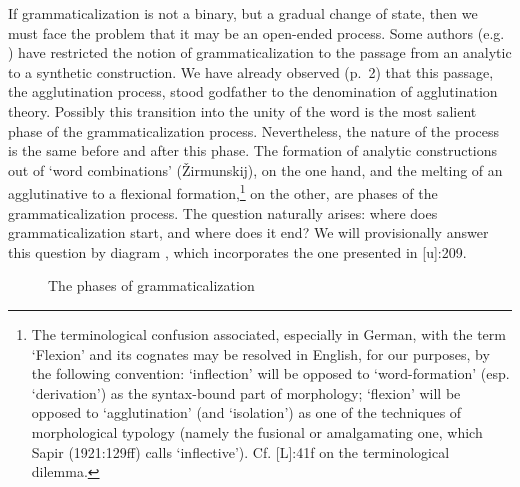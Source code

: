 If grammaticalization is not a binary, but a gradual change of state, then we must face the problem that it may be an open-ended process. Some authors (e.g. \citet[113-115]{Ronneberger-Sibold1980}) have restricted the notion of grammaticalization to the passage from an analytic to a synthetic construction. We have already observed (p.~2) that this passage, the agglutination process, stood godfather to the denomination of agglutination theory. Possibly this transition into the unity of the word is the most salient phase of the grammaticalization process. Nevertheless, the nature of the process is the same before and after this phase. The formation of analytic constructions out of ‘word combinations’ (Žirmunskij), on the one hand, and the melting  of an agglutinative to a flexional formation,\footnote{The terminological confusion associated, especially in German, with the term ‘Flexion’ and its cognates may be resolved in English, for our purposes, by the following convention: ‘inflection’ will be opposed to ‘word-formation’ (esp. ‘derivation’) as the syntax-bound part of morphology; ‘flexion’ will be opposed to ‘agglutination’ (and ‘isolation’) as one of the techniques of morphological typology (namely the fusional or amalgamating one, which Sapir (1921:129ff) calls ‘inflective’). Cf. \citet{Comrie1981}[L]:41f on the terminological dilemma.} on the other, are phases of the grammaticalization process. The question naturally arises: where does grammaticalization start, and where does it end? We will provisionally answer this question by diagram , which incorporates the one presented in \citet{Givón1979}[u]:209.


\begin{figure}
\caption{The phases of grammaticalization}
\end{figure}


